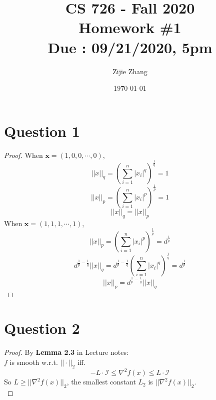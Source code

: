 \documentclass{article}
\title{CS 726 - Fall 2020\\
        {\Large \textbf{Homework \#1}}\\
        {\normalsize \textbf{Due : 09/21/2020, 5pm}}
    }
\author{Zijie Zhang}
\date{\today}
\begin{document}
    \maketitle

\section*{Question 1}
    \begin{proof}
        When $\boldsymbol{x} = (1,0,0,\cdots,0)$,
        $$ ||x||_q = \left(\sum_{i=1}^n|x_i|^q\right)^{\frac{1}{q}} = 1 $$
        $$ ||x||_p = \left(\sum_{i=1}^n|x_i|^p\right)^{\frac{1}{p}} = 1 $$
        $$ ||x||_q = ||x||_p $$
        When $\boldsymbol{x} = (1,1,1,\cdots,1)$,
        $$ ||x||_p = \left(\sum_{i=1}^n|x_i|^p\right)^{\frac{1}{p}} = d^{\frac{1}{p}} $$
        $$ d^{\frac{1}{p}-\frac{1}{q}}||x||_q = d^{\frac{1}{p}-\frac{1}{q}} \left(\sum_{i=1}^n|x_i|^q\right)^{\frac{1}{q}} = d^{\frac{1}{p}} $$
        $$ ||x||_p = d^{\frac{1}{p}-\frac{1}{q}}||x||_q $$
    \end{proof}

\section*{Question 2}
    \begin{proof}
        By \textbf{Lemma 2.3} in Lecture notes:\\
        $f$ is smooth w.r.t. $||\cdot||_2$ iff.
        $$-L\cdot \mathcal{I} \leqslant \nabla^2 f(x) \leqslant L \cdot \mathcal{I}$$
        So $L \geqslant ||\nabla^2 f(x)||_2$, the smallest constant $L_2$ is $||\nabla^2 f(x)||_2$.\\


    \end{proof}

\end{document}
